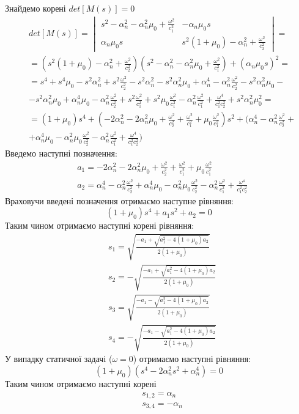 Знайдемо корені $det[M(s)]=0$
\begin{align*}
    &det[M(s)] = 
    \begin{vmatrix}
        s^2 - \alpha_n^2 - \alpha_n^2\mu_0 + \frac{\omega^2}{c_1^2} & -\alpha_n \mu_0 s \\
        \alpha_n \mu_0 s & s^2 (1 + \mu_0) -\alpha_n^2 + \frac{\omega^2}{c_2^2}
     \end{vmatrix} = \\
    &= (s^2 (1 + \mu_0) -\alpha_n^2 + \frac{\omega^2}{c_2^2})(s^2 - \alpha_n^2 - \alpha_n^2\mu_0 + \frac{\omega^2}{c_1^2}) + (\alpha_n \mu_0 s)^2 = \\
    &= s^4 + s^4 \mu_0 - s^2 \alpha_n^2 + s^2 \frac{\omega^2}{c_2^2} - s^2 \alpha_n^2 - s^2 \alpha_n^2 \mu_0 + \alpha_n^4 - \alpha_n^2 \frac{\omega^2}{c_2^2} - s^2 \alpha_n^2 \mu_0 - \\
    &- s^2 \alpha_n^2 \mu_0 + \alpha_n^4 \mu_0 - \alpha_n^2 \frac{\omega^2}{c_2^2} + s^2 \frac{\omega^2}{c_1^2} + s^2 \mu_0 \frac{\omega^2}{c_1^2} - \alpha_n^2 \frac{\omega^2}{c_1^2} + \frac{\omega^4}{c_1^2 c_2^2} + s^2 \alpha_n^2 \mu_0^2 = \\
    &=(1 + \mu_0) s^4 + (-2 \alpha_n^2 - 2 \alpha_n^2 \mu_0 + \frac{\omega^2}{c_2^2} + \frac{\omega^2}{c_1^2} + \mu_0 \frac{\omega^2}{c_1^2}) s^2 + (\alpha_n^4 - \alpha_n^2 \frac{\omega^2}{c_2^2} + \\ 
    &+ \alpha_n^4 \mu_0 - \alpha_n^2 \mu_0 \frac{\omega^2}{c_2^2} - \alpha_n^2 \frac{\omega^2}{c_1^2} + \frac{\omega^4}{c_1^2 c_2^2})
\end{align*}
Введемо наступні позначення:
\begin{align*}
    &a_1 = -2 \alpha_n^2 - 2 \alpha_n^2 \mu_0 + \frac{\omega^2}{c_2^2} + \frac{\omega^2}{c_1^2} + \mu_0 \frac{\omega^2}{c_1^2} \\
    &a_2 = \alpha_n^4 - \alpha_n^2 \frac{\omega^2}{c_2^2} + \alpha_n^4 \mu_0 - \alpha_n^2 \mu_0 \frac{\omega^2}{c_2^2} - \alpha_n^2 \frac{\omega^2}{c_1^2} + \frac{\omega^4}{c_1^2 c_2^2}
\end{align*}
Враховучи введені позначення отримаємо наступне рівняння:
\begin{equation*}
    (1 + \mu_0) s^4 + a_1 s^2 + a_2 = 0
\end{equation*}
Таким чином отримаємо наступні корені рівняння:
\begin{align*}
    &s_1 = \sqrt{\frac{ -a_1 + \sqrt{a_1^2 - 4(1 + \mu_0)a_2}}{2 (1 + \mu_0)}} \\
    &s_2 = -\sqrt{\frac{ -a_1 + \sqrt{a_1^2 - 4(1 + \mu_0)a_2}}{2 (1 + \mu_0)}} \\
    &s_3 = \sqrt{\frac{ -a_1 - \sqrt{a_1^2 - 4(1 + \mu_0)a_2}}{2 (1 + \mu_0)}} \\
    &s_4 = -\sqrt{\frac{ -a_1 - \sqrt{a_1^2 - 4(1 + \mu_0)a_2}}{2 (1 + \mu_0)}}
\end{align*}
У випадку статичної задачі ($\omega = 0$) отримаємо наступні рівняння:
\begin{equation*}
    (1 + \mu_0) (s^4 - 2 \alpha_n^2 s^2 + \alpha_n^4) = 0
\end{equation*}
Таким чином отримаємо наступні корені
\begin{align*}
    &s_{1,2} = \alpha_n \\
    &s_{3, 4} = -\alpha_n
\end{align*}
